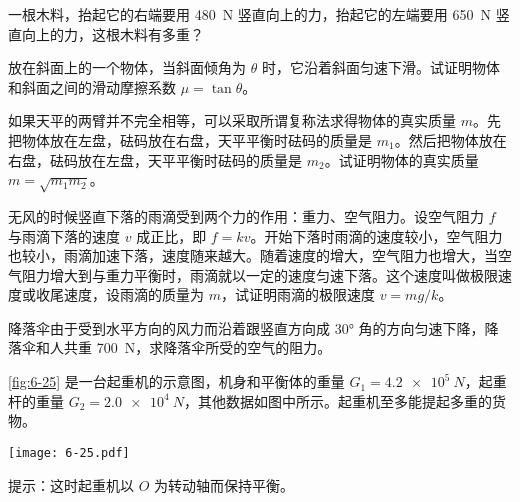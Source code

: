 \begin{Exercise}
\begin{question}


\item 一根木料，抬起它的右端要用 \qty{480}{N} 竖直向上的力，抬起它的左端要用 \qty{650}{N} 竖直向上的力，这根木料有多重？
\item 放在斜面上的一个物体，当斜面倾角为 $\theta$ 时，它沿着斜面匀速下滑。试证明物体和斜面之间的滑动摩擦系数 $\mu=\tan \theta$。
\item 如果天平的两臂并不完全相等，可以采取所谓复称法求得物体的真实质量 $m$。先把物体放在左盘，砝码放在右盘，天平平衡时砝码的质量是 $m_1$。然后把物体放在右盘，砝码放在左盘，天平平衡时砝码的质量是 $m_2$。试证明物体的真实质量 $m=\sqrt{m_1m_2}$。
\item 无风的时候竖直下落的雨滴受到两个力的作用：重力、空气阻力。设空气阻力 $f$ 与雨滴下落的速度 $v$ 成正比，即 $f=kv$。开始下落时雨滴的速度较小，空气阻力也较小，雨滴加速下落，速度随来越大。随着速度的增大，空气阻力也增大，当空气阻力增大到与重力平衡时，雨滴就以一定的速度匀速下落。这个速度叫做极限速度或收尾速度，设雨滴的质量为 $m$，试证明雨滴的极限速度 $v=mg/k$。
\item 降落伞由于受到水平方向的风力而沿着跟竖直方向成 \ang{30} 角的方向匀速下降，降落伞和人共重 \qty{700}{N}，求降落伞所受的空气的阻力。
\item \cref{fig:6-25} 是一台起重机的示意图，机身和平衡体的重量 $G_1=\qty{4.2e5}{N}$，起重杆的重量 $G_2=\qty{2.0e4}{N}$，其他数据如图中所示。起重机至多能提起多重的货物。
\begin{figurehere}
  \begin{minipage}{\linewidth}\centering
    \texttt{[image: 6-25.pdf]}
    \caption{}\label{fig:6-25}
  \end{minipage}
\end{figurehere}
提示：这时起重机以 $O$ 为转动轴而保持平衡。


\end{question}
\end{Exercise}
